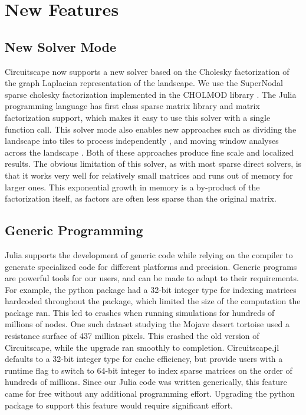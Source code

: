 \documentclass{juliacon}
\begin{document}
\section{New Features}

\subsection{New Solver Mode}

Circuitscape now supports a new solver based on the Cholesky factorization of the graph Laplacian representation of the landscape. We use the SuperNodal sparse cholesky factorization implemented in the CHOLMOD library \cite{chen2008algorithm}. The Julia programming language has first class sparse matrix library and matrix factorization support, which makes it easy to use this solver with a single function call. This solver mode also enables new approaches such as dividing the landscape into tiles to process independently \cite{pelletier2014applying} , and moving window analyses across the landscape \cite{mcrae2016conserving}. Both of these approaches produce fine scale and localized results. The obvious limitation of this solver, as with most sparse direct solvers, is that it works very well for relatively small matrices and runs out of memory for larger ones. This exponential growth in memory is a by-product of the factorization itself, as factors are often less sparse than the original matrix. 


\subsection{Generic Programming}

Julia supports the development of generic code while relying on the compiler to generate specialized code for different platforms and precision. Generic programs are powerful tools for our users, and can be made to adapt to their requirements. For example, the python package had a 32-bit integer type for indexing matrices hardcoded throughout the package, which limited the size of the computation the package ran. This led to crashes when running simulations for hundreds of millions of nodes. One such dataset studying the Mojave desert tortoise \cite{gray2019} used a resistance surface of 437 million pixels. This crashed the old version of Circuitscape, while the upgrade ran smoothly to completion. Circuitscape.jl defaults to a 32-bit integer type for cache efficiency, but provide users with a runtime flag to switch to 64-bit integer to index sparse matrices on the order of hundreds of millions. Since our Julia code was written generically, this feature came for free without any additional programming effort. Upgrading the python package to support this feature would require significant effort. 
\end{document}
